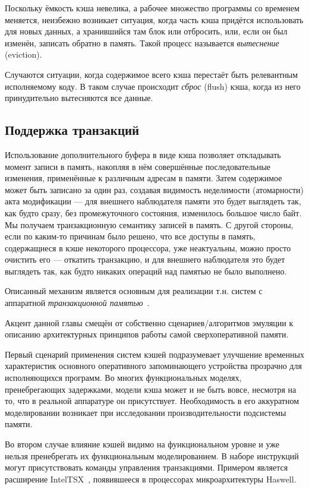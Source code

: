 Поскольку ёмкость кэша невелика, а рабочее множество программы со временем меняется, неизбежно возникает ситуация, когда часть кэша придётся использовать для новых данных, а хранившийся там блок или отбросить, или, если он был изменён, записать обратно в память. Такой процесс называется \textit{вытеснение} (\abbr eviction).

Случаются ситуации, когда содержимое всего кэша перестаёт быть релевантным исполняемому коду. В таком случае происходит \textit{сброс} (\abbr flush) кэша, когда из него принудительно вытесняются все данные.

\subsection{Поддержка транзакций}

Использование дополнительного буфера в виде кэша позволяет откладывать момент записи в память, накопляя в нём совершённые последовательные изменения, применённые к различным адресам в памяти. Затем содержимое может быть записано за один раз, создавая видимость неделимости (атомарности) акта модификации ---  для внешнего наблюдателя памяти это будет выглядеть так, как будто сразу, без промежуточного состояния, изменилось большое число байт. Мы получаем транзакционную семантику записей в память. С другой стороны, если по каким-то причинам было решено, что все доступы в память, содержащиеся в кэше некоторого процессора, уже неактуальны, можно просто очистить его --- откатить транзакцию, и для внешнего наблюдателя это будет выглядеть так, как будто никаких операций над памятью не было выполнено.

Описанный  механизм является основным для реализации т.н. систем с аппаратной \textit{транзакционной памятью}~\cite{rajwar2002}.

\begin{digression}

Акцент данной главы смещён от собственно сценариев/алгоритмов эмуляции к описанию архитектурных принципов работы самой сверхоперативной памяти. 

Первый сценарий применения систем кэшей подразумевает улучшение временных характеристик основного оперативного запоминающего устройства прозрачно для исполняющихся программ. Во многих функциональных моделях, пренебрегающих задержками, модели кэша может и не быть вовсе, несмотря на то, что в реальной аппаратуре он присутствует. Необходимость в его аккуратном моделировании возникает при  исследовании производительности подсистемы памяти.

Во втором случае влияние кэшей видимо на функциональном уровне и уже нельзя пренебрегать их функциональным моделированием. В наборе инструкций могут присутствовать команды управления транзакциями. Примером является расширение Intel\textregistered TSX~\cite[глава 8]{intel-x-reference}, появившееся в процессорах микроархитектуры Haswell.

\end{digression}


